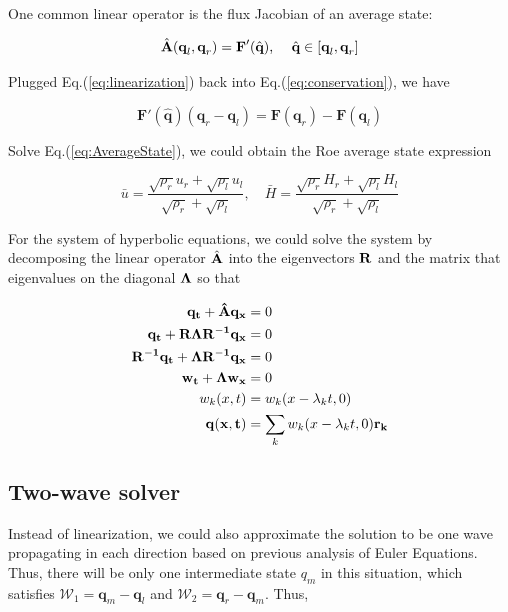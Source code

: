 \documentclass[11pt]{diazessay} %
\begin{document}
One common linear operator is the flux Jacobian of an average state:

\begin{equation}\label{eq:linearization}
    \hat{\bf{A}}(\textbf{q}_l, \textbf{q}_r) = \textbf{F}'(\hat{\textbf{q}})\text{, }\quad \hat{\textbf{q}}\in[\textbf{q}_l, \textbf{q}_r]
\end{equation}

Plugged Eq.(\ref{eq:linearization}) back into Eq.(\ref{eq:conservation}), we have


\begin{equation}\label{eq:AverageState}
    \textbf{F}'(\hat{\textbf{q}})(\textbf{q}_r-\textbf{q}_l) = \textbf{F}(\textbf{q}_r) - \textbf{F}(\textbf{q}_l)
\end{equation}

Solve Eq.(\ref{eq:AverageState}), we could obtain the Roe average state expression

\begin{equation}
    \bar{u} = \frac{\sqrt{\rho_r}u_r + \sqrt{\rho_l}u_l}{\sqrt{\rho_r}+\sqrt{\rho_l}}, \quad \bar{H} =\frac{\sqrt{\rho_r}H_r + \sqrt{\rho_l}H_l}{\sqrt{\rho_r}+\sqrt{\rho_l}}
\end{equation}

For the system of hyperbolic equations, we could solve the system by decomposing the linear operator $\hat{\bf{A}}$ into the eigenvectors $\bf{R}$ and the matrix that eigenvalues on the diagonal $\bf{\Lambda}$ so that

$$
\begin{aligned}
    \bf{q}_t + \hat{\bf{A}} \bf{q}_x  &= 0\\
    \bf{q}_t + \bf{R}\Lambda\bf{R}^{-1}\bf{q}_x & = 0\\
    \bf{R}^{-1}\bf{q}_t + \Lambda\bf{R}^{-1}\bf{q}_x & = 0\\
    \bf{w}_t + \Lambda\bf{w}_x & = 0\\
    w_k(x, t) & = w_k(x-\lambda_k t, 0)\\
    \bf{q}(x, t) & = \sum_k w_k(x-\lambda_k t, 0) \bf{r_k}
\end{aligned}
$$


\subsection{Two-wave solver}

Instead of linearization, we could also approximate the solution to be one wave propagating in each direction based on previous analysis of Euler Equations. Thus, there will be only one intermediate state $q_m$ in this situation, which satisfies $\mathcal{W}_1=\textbf{q}_m-\textbf{q}_l$ and $\mathcal{W}_2=\textbf{q}_r-\textbf{q}_m$. Thus,
\end{document}

